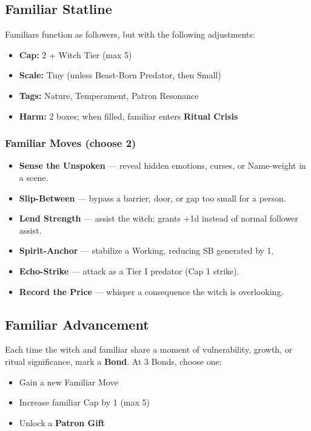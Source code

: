 \documentclass[11pt]{book}
\begin{document}
\subsection{Familiar Statline}
Familiars function as followers, but with the following adjustments:

\begin{itemize}[leftmargin=1.5em]
    \item \textbf{Cap:} 2 + Witch Tier (max 5)
    \item \textbf{Scale:} Tiny (unless Beast-Born Predator, then Small)
    \item \textbf{Tags:} Nature, Temperament, Patron Resonance
    \item \textbf{Harm:} 2 boxes; when filled, familiar enters \textbf{Ritual Crisis}
\end{itemize}

\subsubsection*{Familiar Moves (choose 2)}
\begin{itemize}[leftmargin=1.5em]
    \item \textbf{Sense the Unspoken} --- reveal hidden emotions, curses, or Name-weight in a scene.
    \item \textbf{Slip-Between} --- bypass a barrier, door, or gap too small for a person.
    \item \textbf{Lend Strength} --- assist the witch; grants +1d instead of normal follower assist.
    \item \textbf{Spirit-Anchor} --- stabilize a Working, reducing SB generated by 1.
    \item \textbf{Echo-Strike} --- attack as a Tier I predator (Cap 1 strike).
    \item \textbf{Record the Price} --- whisper a consequence the witch is overlooking.
\end{itemize}

\subsection{Familiar Advancement}

Each time the witch and familiar share a moment of vulnerability, growth, or
ritual significance, mark a \textbf{Bond}. At 3 Bonds, choose one:

\begin{itemize}[leftmargin=1.5em]
    \item Gain a new Familiar Move
    \item Increase familiar Cap by 1 (max 5)
    \item Unlock a \textbf{Patron Gift}
\end{itemize}
\end{document}
